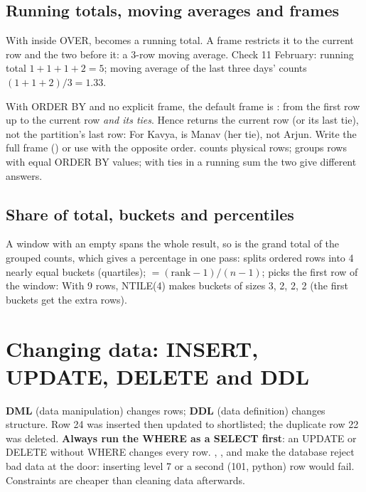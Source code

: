 \subsection{Running totals, moving averages and frames}
With  inside OVER,  becomes a running total. A frame  restricts it to the current
row and the two before it: a 3-row moving average.
Check 11 February: running total $1 + 1 + 1 + 2 = 5$; moving average of the last three days' counts $(1 + 1 + 2)/3 = 1.33$.

\begin{trap}
With ORDER BY and no explicit frame, the default frame is : from the first row up to the current
row \emph{and its ties}. Hence  returns the current row (or its last tie), not the partition's last row:
For Kavya,  is Manav (her tie), not Arjun. Write the full frame () or
use  with the opposite order.  counts physical rows;  groups rows with equal ORDER BY values; with ties in a
running sum the two give different answers.
\end{trap}

\subsection{Share of total, buckets and percentiles}
A window with an empty  spans the whole result, so  is the grand total of the grouped counts, which gives a
percentage in one pass:
 splits ordered rows into 4 nearly equal buckets (quartiles);  $= (\text{rank} - 1)/(n - 1)$; 
picks the first row of the window:
With 9 rows, NTILE(4) makes buckets of sizes 3, 2, 2, 2 (the first buckets get the extra rows).

\section{Changing data: INSERT, UPDATE, DELETE and DDL}
\textbf{DML} (data manipulation) changes rows; \textbf{DDL} (data definition) changes structure.
Row 24 was inserted then updated to shortlisted; the duplicate row 22 was deleted. \textbf{Always run the WHERE as a SELECT first}: an UPDATE or DELETE
without WHERE changes every row.
, ,  and  make the database reject bad data at the door: inserting level 7 or a second
(101, python) row would fail. Constraints are cheaper than cleaning data afterwards.

